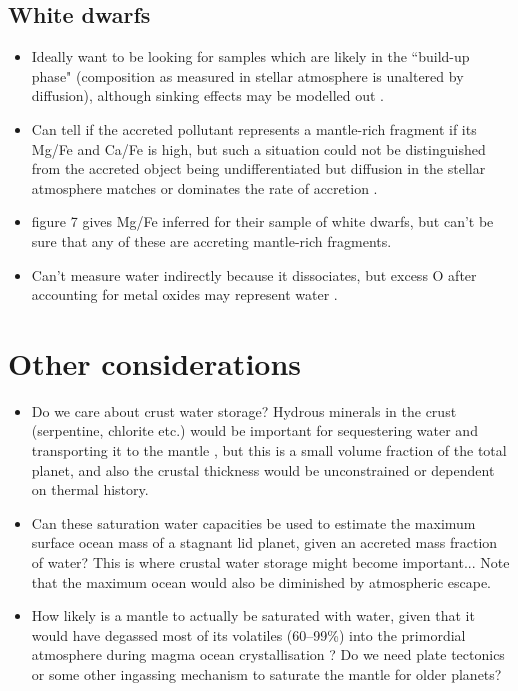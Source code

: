 \documentclass{article}
\begin{document}
\subsection{White dwarfs}
\begin{itemize}
\item Ideally want to be looking for samples which are likely in the ``build-up phase" (composition as measured in stellar atmosphere is unaltered by diffusion), although sinking effects may be modelled out \citep{2021MNRAS.504.2853H}.
\item Can tell if the accreted pollutant represents a mantle-rich fragment if its Mg/Fe and Ca/Fe is high, but such a situation could not be distinguished from the accreted object being undifferentiated but diffusion in the stellar atmosphere matches or dominates the rate of accretion \citep{2021MNRAS.504.2853H}.
\item \citet{2021MNRAS.504.2853H} figure 7 gives Mg/Fe inferred for their sample of white dwarfs, but can't be sure that any of these are accreting mantle-rich fragments. 
\item Can't measure water indirectly because it dissociates, but excess O after accounting for metal oxides may represent water \citep{xuExogeologyPollutedWhite2021}.
\end{itemize}


\section{Other considerations}

\begin{itemize}
\item Do we care about crust water storage? Hydrous minerals in the crust (serpentine, chlorite etc.) would be important for sequestering water and transporting it to the mantle \citep[see e.g.,][]{herbortAtmospheresRockyExoplanets2020, dyckEffectCoreFormation2021}, but this is a small volume fraction of the total planet, and also the crustal thickness would be unconstrained or dependent on thermal history. \citep{honingContinentalGrowthMantle2016}
\item Can these saturation water capacities be used to estimate the maximum surface ocean mass of a stagnant lid planet, given an accreted mass fraction of water? This is where crustal water storage might become important... Note that the maximum ocean would also be diminished by atmospheric escape.
\item How likely is a mantle to actually be saturated with water, given that it would have degassed most of its volatiles (60--99\%) into the primordial atmosphere during magma ocean crystallisation \citep{elkins-tantonLinkedMagmaOcean2008, elkins-tantonFormationEarlyWater2011}? Do we need plate tectonics or some other ingassing mechanism to saturate the mantle for older planets?
\end{itemize}



 
\end{document}
